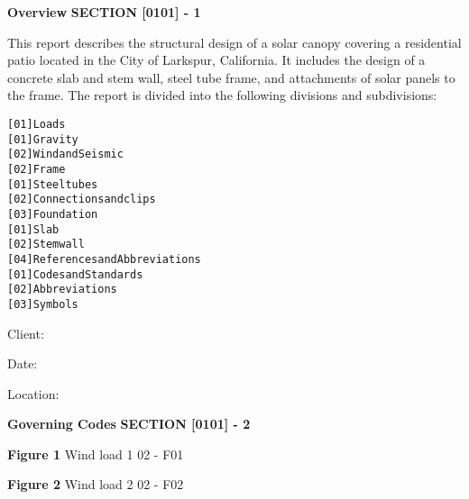 \documentclass[12pt,notitle,letterpaper]{report}
\renewenvironment{quote}
{\small\list{}{\rightmargin=0cm \leftmargin=0cm}%
    \item\relax}
{\endlist}
\begin{document}
\setcounter{page}{5}

\makeatletter
\renewcommand\@dotsep{10000}\makeatother


\vspace{.2in}   \textbf{ Overview}   \hfill\textbf{SECTION [0101] - 1 }
\newline   \vspace{.05in}   {\color{black}\hrulefill}

This report describes the structural design of a solar canopy covering a
residential patio located in the City of Larkspur, California. It includes
the design of a concrete slab and stem wall, steel tube frame, and
attachments of solar panels to the frame. The report is divided into the
following divisions and subdivisions:

\begin{quote}
\begin{alltt}
[01] Loads
    [01] Gravity
    [02] Wind and Seismic
[02] Frame
    [01] Steel tubes
    [02] Connections and clips
[03] Foundation
    [01] Slab
    [02] Stem wall
[04] References and Abbreviations
    [01] Codes and Standards
    [02] Abbreviations
    [03] Symbols
\end{alltt}
\end{quote}

Client:

Date:

Location:

\vspace{.2in}   \textbf{ Governing Codes}   \hfill\textbf{SECTION [0101] - 2 }
\newline   \vspace{.05in}   {\color{black}\hrulefill}

\noindent{}

\vspace{.05in}

\textbf{Figure 1} Wind load 1 \hfill 02 - F01

  \vspace{.05in}

\nopagebreak

\noindent{}

\vspace{.05in}

\textbf{Figure 2} Wind load 2 \hfill 02 - F02
\end{document}
